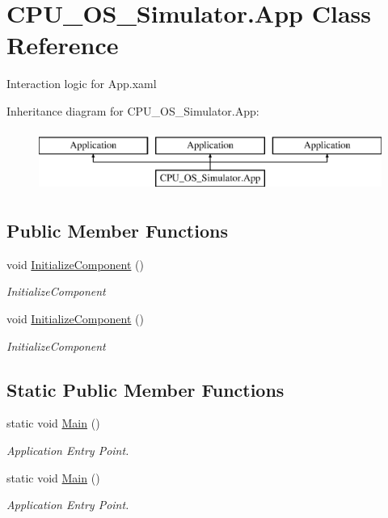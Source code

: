 \hypertarget{class_c_p_u___o_s___simulator_1_1_app}{}\section{C\+P\+U\+\_\+\+O\+S\+\_\+\+Simulator.\+App Class Reference}
\label{class_c_p_u___o_s___simulator_1_1_app}


Interaction logic for App.\+xaml  


Inheritance diagram for C\+P\+U\+\_\+\+O\+S\+\_\+\+Simulator.\+App\+:\begin{figure}[H]
\begin{center}
\leavevmode
\includegraphics[height=2.000000cm]{class_c_p_u___o_s___simulator_1_1_app}
\end{center}
\end{figure}
\subsection*{Public Member Functions}
\begin{DoxyCompactItemize}
\item 
void \hyperlink{class_c_p_u___o_s___simulator_1_1_app_a15e2e0e02c8dbe7d5d3fba5d21f3e56f}{Initialize\+Component} ()
\begin{DoxyCompactList}\small\item\em Initialize\+Component \end{DoxyCompactList}\item 
void \hyperlink{class_c_p_u___o_s___simulator_1_1_app_a15e2e0e02c8dbe7d5d3fba5d21f3e56f}{Initialize\+Component} ()
\begin{DoxyCompactList}\small\item\em Initialize\+Component \end{DoxyCompactList}\end{DoxyCompactItemize}
\subsection*{Static Public Member Functions}
\begin{DoxyCompactItemize}
\item 
static void \hyperlink{class_c_p_u___o_s___simulator_1_1_app_a7bbb69f458b77923e336283b1653ce69}{Main} ()
\begin{DoxyCompactList}\small\item\em Application Entry Point. \end{DoxyCompactList}\item 
static void \hyperlink{class_c_p_u___o_s___simulator_1_1_app_a7bbb69f458b77923e336283b1653ce69}{Main} ()
\begin{DoxyCompactList}\small\item\em Application Entry Point. \end{DoxyCompactList}\end{DoxyCompactItemize}


